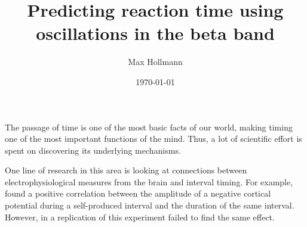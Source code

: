 \documentclass[man,floatsintext]{apa6} %
\title{Predicting reaction time using oscillations in the beta band}
\author{Max Hollmann}
\affiliation{University of Groningen}
\date{\today}
\begin{document}
\maketitle

%



The passage of time is one of the most basic facts of our world,
making timing one of the most important functions of the mind.  Thus,
a lot of scientific effort is spent on discovering its underlying
mechanisms.

One line of research in this area is looking at connections between
electrophysiological measures from the brain and interval timing.  For
example,  found a positive correlation
between the amplitude of a negative cortical potential during a
self-produced interval and the duration of the same interval.
However, in a replication of this experiment
 failed to find the same effect.
\end{document}
